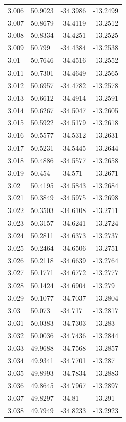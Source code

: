 \begin{tabular}{llll}
3.006 & 50.9023 & -34.3986 & -13.2499 \\
3.007 & 50.8679 & -34.4119 & -13.2512 \\
3.008 & 50.8334 & -34.4251 & -13.2525 \\
3.009 & 50.799 & -34.4384 & -13.2538 \\
3.01 & 50.7646 & -34.4516 & -13.2552 \\
3.011 & 50.7301 & -34.4649 & -13.2565 \\
3.012 & 50.6957 & -34.4782 & -13.2578 \\
3.013 & 50.6612 & -34.4914 & -13.2591 \\
3.014 & 50.6267 & -34.5047 & -13.2605 \\
3.015 & 50.5922 & -34.5179 & -13.2618 \\
3.016 & 50.5577 & -34.5312 & -13.2631 \\
3.017 & 50.5231 & -34.5445 & -13.2644 \\
3.018 & 50.4886 & -34.5577 & -13.2658 \\
3.019 & 50.454 & -34.571 & -13.2671 \\
3.02 & 50.4195 & -34.5843 & -13.2684 \\
3.021 & 50.3849 & -34.5975 & -13.2698 \\
3.022 & 50.3503 & -34.6108 & -13.2711 \\
3.023 & 50.3157 & -34.6241 & -13.2724 \\
3.024 & 50.2811 & -34.6373 & -13.2737 \\
3.025 & 50.2464 & -34.6506 & -13.2751 \\
3.026 & 50.2118 & -34.6639 & -13.2764 \\
3.027 & 50.1771 & -34.6772 & -13.2777 \\
3.028 & 50.1424 & -34.6904 & -13.279 \\
3.029 & 50.1077 & -34.7037 & -13.2804 \\
3.03 & 50.073 & -34.717 & -13.2817 \\
3.031 & 50.0383 & -34.7303 & -13.283 \\
3.032 & 50.0036 & -34.7436 & -13.2844 \\
3.033 & 49.9688 & -34.7568 & -13.2857 \\
3.034 & 49.9341 & -34.7701 & -13.287 \\
3.035 & 49.8993 & -34.7834 & -13.2883 \\
3.036 & 49.8645 & -34.7967 & -13.2897 \\
3.037 & 49.8297 & -34.81 & -13.291 \\
3.038 & 49.7949 & -34.8233 & -13.2923 \\

\end{tabular}
